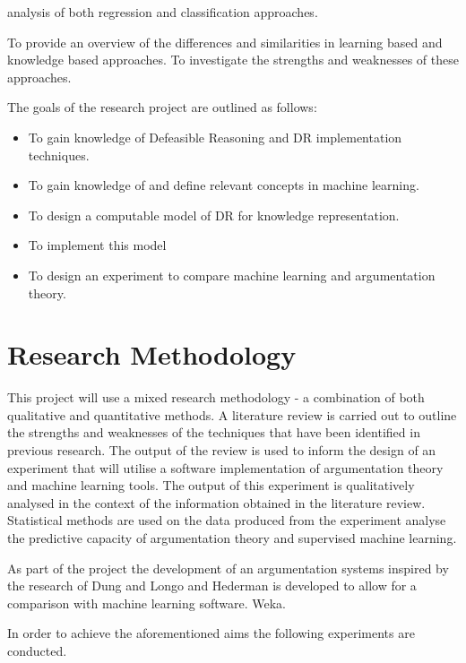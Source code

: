  analysis of both regression and classification approaches.

To provide an overview of the differences and similarities in learning based and knowledge based approaches. To investigate the strengths and weaknesses of these approaches. 

The goals of the research project are outlined as follows:

\begin{itemize}

  \item To gain knowledge of Defeasible Reasoning and DR implementation techniques.
  \item To gain knowledge of and define relevant concepts in machine learning.
  \item To design a computable model of DR for knowledge representation.
  \item To implement this model
  \item To design an experiment to compare machine learning and argumentation theory.
  
\end{itemize}


\section{Research Methodology}


This project will use a mixed research methodology - a combination of both qualitative and quantitative methods. A literature review is carried out to outline the strengths and weaknesses of the techniques that have been identified in previous research. The output of the review is used to inform the design of an experiment that will utilise a software implementation of argumentation theory and machine learning tools. The output of this experiment is qualitatively analysed in the context of the information obtained in the literature review. Statistical methods are used on the data produced from the experiment analyse the predictive capacity of argumentation theory and supervised machine learning. 

As part of the project the development of an argumentation systems inspired by the research of Dung and Longo and Hederman is developed to allow for a comparison with machine learning software. Weka. 


In order to achieve the aforementioned aims the following experiments are conducted.

